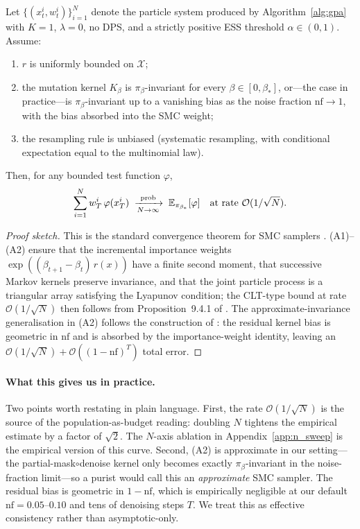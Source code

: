 \begin{theorem}\label{thm:smc-app}
Let $\{(x_t^i,w_t^i)\}_{i=1}^N$ denote the particle system produced by Algorithm~\ref{alg:gpa} with $K\!=\!1$, $\lambda\!=\!0$, no DPS, and a strictly positive ESS threshold $\alpha\!\in\!(0,1)$. Assume:
\begin{enumerate}[label=(A\arabic*)]
\item $r$ is uniformly bounded on $\mathcal{X}$;
\item the mutation kernel $K_{\beta}$ is $\pi_\beta$-invariant for every $\beta\!\in\![0,\beta_*]$, or—the case in practice—is $\pi_\beta$-invariant up to a vanishing bias as the noise fraction $\mathrm{nf}\!\to\!1$, with the bias absorbed into the SMC weight;
\item the resampling rule is unbiased (systematic resampling, with conditional expectation equal to the multinomial law).
\end{enumerate}
Then, for any bounded test function $\varphi$,
\[
\sum_{i=1}^N w_T^i\,\varphi(x_T^i)\;\xrightarrow[N\to\infty]{\mathrm{prob}}\;\mathbb{E}_{\pi_{\beta_*}}[\varphi]\quad\text{at rate }\mathcal{O}(1/\sqrt{N}).
\]
\end{theorem}

\begin{proof}[Proof sketch]
This is the standard convergence theorem for SMC samplers \citep[Thm.~1]{delmoral2006smc}. (A1)–(A2) ensure that the incremental importance weights $\exp((\beta_{t+1}\!-\!\beta_t)\,r(x))$ have a finite second moment, that successive Markov kernels preserve invariance, and that the joint particle process is a triangular array satisfying the Lyapunov condition; the CLT-type bound at rate $\mathcal{O}(1/\sqrt{N})$ then follows from Proposition~9.4.1 of \citet{naesseth2019elements}. The approximate-invariance generalisation in (A2) follows the construction of \citet[\S2.3]{rerd2025}: the residual kernel bias is geometric in $\mathrm{nf}$ and is absorbed by the importance-weight identity, leaving an $\mathcal{O}(1/\sqrt{N})\!+\!\mathcal{O}((1\!-\!\mathrm{nf})^T)$ total error.
\end{proof}

\paragraph{What this gives us in practice.}
Two points worth restating in plain language. First, the rate $\mathcal{O}(1/\sqrt{N})$ is the source of the population-as-budget reading: doubling $N$ tightens the empirical estimate by a factor of $\sqrt{2}$. The $N$-axis ablation in Appendix~\ref{app:n_sweep} is the empirical version of this curve. Second, (A2) is approximate in our setting—the partial-mask$\circ$denoise kernel only becomes exactly $\pi_\beta$-invariant in the noise-fraction limit—so a purist would call this an \emph{approximate} SMC sampler. The residual bias is geometric in $1\!-\!\mathrm{nf}$, which is empirically negligible at our default $\mathrm{nf}\!=\!0.05$--$0.10$ and tens of denoising steps $T$. We treat this as effective consistency rather than asymptotic-only.

